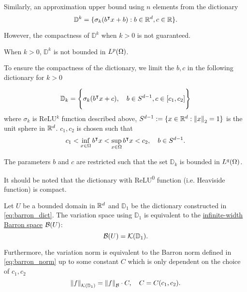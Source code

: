 Similarly, an approximation upper bound using $n$ elements from the dictionary 
\begin{equation}
    \mathbb{D}^k = \{
        \sigma_k(b{}^{\intercal} x + b): b\in\mathbb{R}^d, c\in\mathbb{R}
    \}.
\end{equation}

However, the compactness of $\mathbb{D}^k$ when $k > 0$ is not guaranteed. 

\begin{proposition}
    When $k > 0$, $\mathbb{D}^k$ is not bounded in $L^{p}(\Omega)$.
\end{proposition}

To ensure the compactness of the dictionary, we limit the $b, c$ in the
following dictionary for $k>0$

\begin{equation}
    \label{eq:barron_dict}
    \mathbb{D}_{k} = \Bigg\{
        \sigma_k(b{}^{\intercal} x + c), \quad b\in S^{d-1}, c\in [c_1, c_2] 
    \Bigg\}
\end{equation}
where $\sigma_k$ is ReLU$^k$ function described above, $S^{d-1} := \{x\in\mathbb{R}^d:
\left\| x \right\|_2 = 1\}$ is the unit sphere in $\mathbb{R}^d$. $c_1, c_2$ is chosen such that
\begin{equation}
    c_1 < \inf_{x\in\Omega} b{}^{\intercal} x < 
    \sup_{x\in\Omega} b{}^{\intercal} x < c_2, \quad
    b \in S^{d-1}.
\end{equation}

The parameters $b$ and $c$ are restricted such that the set $\mathbb{D}_k$ is
bounded in $L^{q}(\Omega)$.

It should be noted that the dictionary with ReLU\textsuperscript{0} function
(i.e. Heaviside function) is compact.

\begin{proposition}
    Let $U$ be a bounded domain in $\mathbb{R}^d$ and $\mathbb{D}_1$ be the
    dictionary constructed in \eqref{eq:barron_dict}. The variation space using $\mathbb{D}_1$ is equivalent to the \hyperref[def:barron_space]{infinite-width Barron space} $\mathcal{B}(U)$:
    \begin{equation}
        \mathcal{B}(U) = \mathcal{K}({\mathbb{D}_1}).
    \end{equation}
    
    Furthermore, the variation norm is equivalent to the Barron norm defined in
    \eqref{eq:barron_norm} up to some constant $C$ which is only dependent on
    the choice of $c_1, c_2$
    \begin{equation}
        \left\| {f} \right\|_{\mathcal{K}({\mathbb{D}_1})} = \left\| f \right\|_{\mathcal{B}} \cdot C, \quad 
        C = C(c_1, c_2).
    \end{equation}
\end{proposition}

